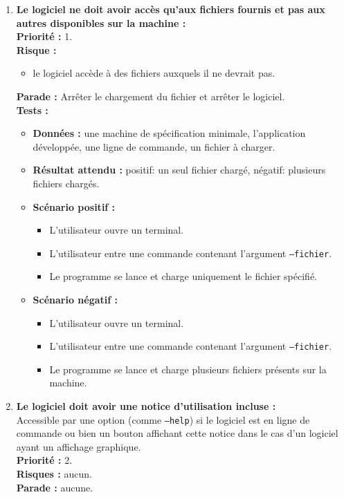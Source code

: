 \documentclass{article}
\newcommand{\code}[1]{\colorbox{light-gray}{\texttt{#1}}}
\begin{document}
\begin{enumerate}
    \item \textbf{Le logiciel ne doit avoir accès qu’aux fichiers fournis et pas aux autres disponibles sur la machine :} \\
    \textbf{Priorité :} 1. \\
    \textbf{Risque :} 
    \begin{itemize}
        \item le logiciel accède à des fichiers auxquels il ne devrait pas.
    \end{itemize}
    \textbf{Parade :} Arrêter le chargement du fichier et arrêter le logiciel.\\
    \textbf{Tests :}
    \begin{itemize}
        \item \textbf{Données :} une machine de spécification minimale, l'application développée, une ligne de commande, un fichier à charger.
        \item \textbf{Résultat attendu :} positif: un seul fichier chargé, négatif: plusieurs fichiers chargés.
        \item \textbf{Scénario positif :}
        \begin{itemize}
            \item L’utilisateur ouvre un terminal.
            \item L’utilisateur entre une commande contenant l'argument \code{--fichier}.
            \item Le programme se lance et charge uniquement le fichier spécifié.
        \end{itemize}
        \item \textbf{Scénario négatif :}
        \begin{itemize}
            \item L’utilisateur ouvre un terminal.
            \item L’utilisateur entre une commande contenant l'argument \code{--fichier}.
            \item Le programme se lance et charge plusieurs fichiers présents sur la machine.
        \end{itemize}
    \end{itemize}
    
     \item \textbf{Le logiciel doit avoir une notice d'utilisation incluse :} \\
    Accessible par une option (comme \code{--help}) si le logiciel est en ligne de commande ou bien un bouton affichant cette notice dans le cas d'un logiciel ayant un affichage graphique. \\
    \textbf{Priorité :} 2. \\
    \textbf{Risques :} aucun. \\
    \textbf{Parade :} aucune.
    

\end{enumerate}
\end{document}
